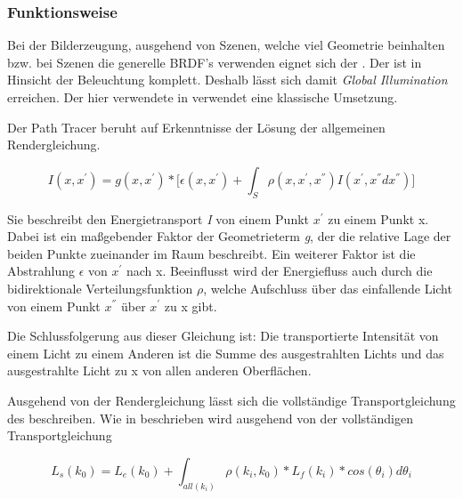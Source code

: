 \subsubsection{Funktionsweise}

Bei der Bilderzeugung, ausgehend von Szenen, welche viel Geometrie beinhalten bzw. bei Szenen 
die generelle BRDF's verwenden eignet sich der .
Der  ist in Hinsicht der Beleuchtung komplett. Deshalb lässt sich damit
\textit{Global Illumination} erreichen. Der hier verwendete  in 
\cite{Benty18} verwendet eine klassische Umsetzung.\par
Der Path Tracer beruht auf Erkenntnisse der Lösung der allgemeinen Rendergleichung.

\begin{equation}\label{eq:Allgemeine Rendergleichung}
    I(x,{x}^{'}) = g(x,{x}^{'}) * \biggl[\epsilon(x,{x}^{'}) + 
    \int_{S}^{} \rho(x,{x}^{'},{x}^{''})
    I({x}^{'},{x}^{''}d{x}^{''})\biggr] 
\end{equation}

Sie beschreibt den Energietransport \textit{I} von einem Punkt ${x}^{'}$
zu einem Punkt x. Dabei ist ein maßgebender Faktor der Geometrieterm \textit{g},
der die relative Lage der beiden Punkte zueinander im Raum beschreibt.
Ein weiterer Faktor ist die Abstrahlung \textit{$\epsilon$} von ${x}^{'}$ nach x. 
Beeinflusst wird der Energiefluss auch durch
die bidirektionale Verteilungsfunktion \textit{$\rho$}, welche Aufschluss über
das einfallende Licht von einem Punkt ${x}^{''}$ über ${x}^{'}$ zu x gibt.\par
Die Schlussfolgerung aus dieser Gleichung  ist: Die transportierte
Intensität von einem Licht zu einem Anderen ist die Summe des ausgestrahlten Lichts 
und das ausgestrahlte Licht zu x von allen anderen Oberflächen.

Ausgehend von der Rendergleichung  lässt sich
die vollständige Transportgleichung des 
beschreiben.
Wie in \cite{marschner2009fundamentals} beschrieben wird ausgehend von der vollständigen Transportgleichung

\begin{equation}\label{eq:vollständige Transportgleichung}
    L_s(k_0) = L_e(k_0) + \int_{all(k_i)}^{} \rho(k_i, k_0)*L_f(k_i)*cos(\theta_i)d\theta_i
\end{equation}

